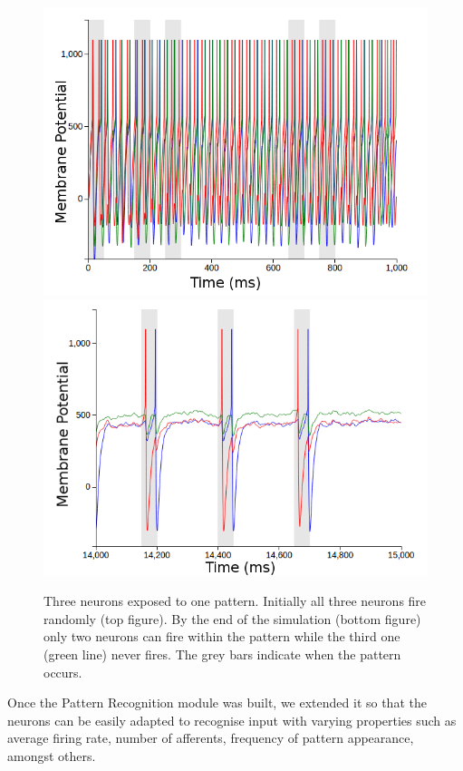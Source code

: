 \documentclass[a4paper,11pt]{article}
\begin{document}
\begin{figure}[H]
\centering
\includegraphics[scale = 0.4]{n3_start}
\includegraphics[scale = 0.4]{n3_end}
\caption{Three neurons exposed to one pattern. Initially all three neurons fire randomly (top figure). By the end of the simulation (bottom figure) only two neurons can fire within the pattern while the third one (green line) never fires. The grey bars indicate when the pattern occurs.}
\label{fig:3n1p}
\end{figure}


Once the Pattern Recognition module was built, we extended it so that the neurons can be easily adapted to recognise input with varying properties such as average firing rate, number of afferents, frequency of pattern appearance, amongst others.
\end{document}
